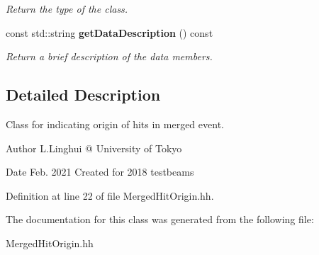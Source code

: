 \begin{DoxyCompactItemize}
\begin{DoxyCompactList}\small\item\em Return the type of the class. \end{DoxyCompactList}\item 
const std\-::string {\bf get\-Data\-Description} () const \label{classCALICE_1_1MergedHitOrigin_a465c7b26ee84e26c08128932f6601977}

\begin{DoxyCompactList}\small\item\em Return a brief description of the data members. \end{DoxyCompactList}\end{DoxyCompactItemize}


\subsection{Detailed Description}
Class for indicating origin of hits in merged event. 

\begin{DoxyAuthor}{Author}
L.\-Linghui @ University of Tokyo 
\end{DoxyAuthor}
\begin{DoxyDate}{Date}
Feb. 2021 Created for 2018 testbeams 
\end{DoxyDate}


Definition at line 22 of file Merged\-Hit\-Origin.\-hh.



The documentation for this class was generated from the following file\-:\begin{DoxyCompactItemize}
\item 
Merged\-Hit\-Origin.\-hh\end{DoxyCompactItemize}

